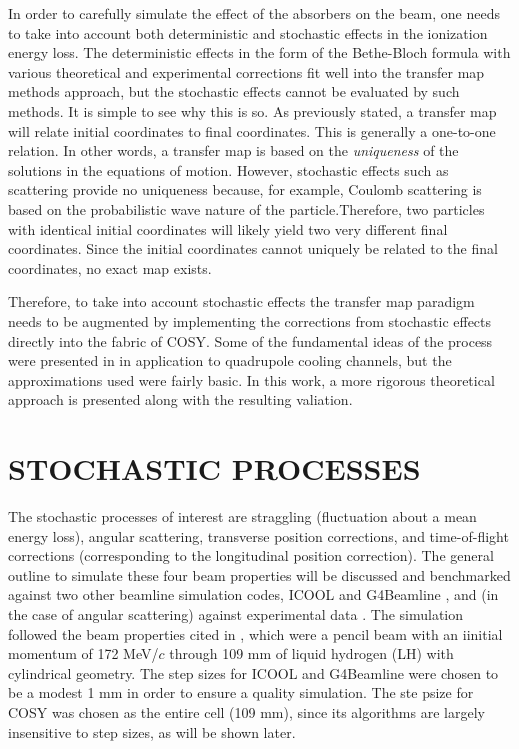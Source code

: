 \documentclass{jacow}
\begin{document}
In order to carefully simulate the effect of the absorbers on the beam, one needs to take into account both deterministic and stochastic effects in the ionization energy loss. The deterministic effects in the form of the Bethe-Bloch formula with various theoretical and experimental corrections fit well into the transfer map methods approach, but the stochastic effects cannot be evaluated by such methods. It is simple to see why this is so. As previously stated, a transfer map will relate initial coordinates to final coordinates. This is generally a one-to-one relation. In other words, a transfer map is based on the \textit{uniqueness} of the solutions in the equations of motion. However, stochastic effects such as scattering provide no uniqueness because, for example, Coulomb scattering is based on the probabilistic wave nature of the particle.Therefore, two particles with identical initial coordinates will likely yield two very different final coordinates. Since the initial coordinates cannot uniquely be related to the final coordinates, no exact map exists.

Therefore, to take into account stochastic effects the transfer map paradigm needs to be augmented by implementing the corrections from stochastic effects directly into the fabric of COSY. Some of the fundamental ideas of the process were presented in \cite{errede} in application to quadrupole cooling channels, but the approximations used were fairly basic. In this work, a more rigorous theoretical approach is presented along with the resulting valiation. 

\section{STOCHASTIC PROCESSES}
The stochastic processes of interest are straggling (fluctuation about a mean energy loss), angular scattering, transverse position corrections, and time-of-flight corrections (corresponding to the longitudinal position correction). The general outline to simulate these four beam properties will be discussed and benchmarked against two other beamline simulation codes, ICOOL \cite{ICOOL} and G4Beamline \cite{G4BL}, and (in the case of angular scattering) against experimental data \cite{Muscat}. The simulation followed the beam properties cited in \cite{Muscat}, which were a pencil beam with an iinitial momentum of 172 MeV/$c$ through 109 mm of liquid hydrogen (LH) with cylindrical geometry. The step sizes for ICOOL and G4Beamline were chosen to be a modest 1 mm in order to ensure a quality simulation. The ste psize for COSY was chosen as the entire cell (109 mm), since its algorithms are largely insensitive to step sizes, as will be shown later.
\end{document}
